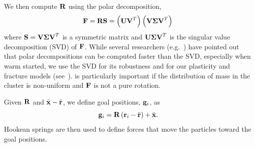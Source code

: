 \documentclass[conference]{acmsiggraph}
\begin{document}
We then compute $\mathit{\mathbf{R}}$ using the polar decomposition,
\begin{equation}
\label{eq:decomp}
\mathit{\mathbf{F}} = \mathit{\mathbf{R}}\mathit{\mathbf{S}} = \left(\mathit{\mathbf{UV}}^T\right)\left(\mathit{\mathbf{V\Sigma V}}^T\right)
\end{equation}
where $\mathit{\mathbf{S}}=\mathit{\mathbf{V\Sigma V}}^T$ is a symmetric matrix and $\mathit{\mathbf{U\Sigma V}}^T$ is the singular value decomposition (SVD) of $\mathit{\mathbf{F}}$.
While several researchers (e.g.~\cite{Rivers:2007:FFL}) have pointed out that polar decompositions can be computed faster than the SVD,
especially when warm started, we use the SVD for its robustness and for our plasticity and fracture models 
(see~).  
is particularly important if the distribution of mass in the cluster is non-uniform and $\mathit{\mathbf{F}}$ is not a pure rotation.

Given $\mathit{\mathbf{R}}$ and $\bar{\mathit{\mathbf{x}}}-\bar{\mathit{\mathbf{r}}}$, we define goal positions, $\mathit{\mathbf{g}}_i$, as
\begin{equation}
\mathit{\mathbf{g}}_i = \mathit{\mathbf{R}}\left(\mathit{\mathbf{r}}_i-\bar{\mathit{\mathbf{r}}}\right)+\bar{\mathit{\mathbf{x}}}.
\end{equation}
Hookean springs are then used to define forces that move the particles toward the goal positions.
\end{document}
